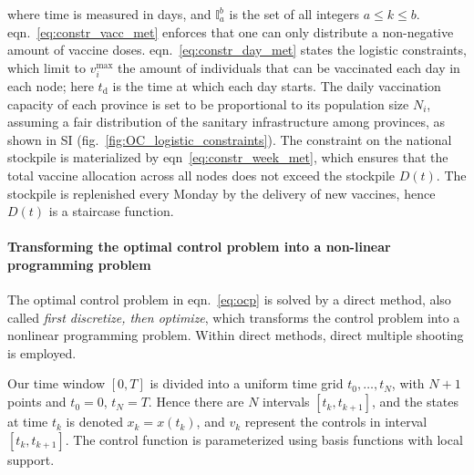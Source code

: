 where time is measured in days, and $\mathbb{I}_a^b$ is the set of all integers $a\leq k\leq b$. eqn.~\eqref{eq:constr_vacc_met} enforces that one can only distribute a non-negative amount of vaccine doses. eqn.~\eqref{eq:constr_day_met} states the logistic constraints, which limit to $v_i^\mathrm{max}$ the amount of individuals that can be vaccinated each day in each node; here $t_\mathrm{d}$ is the time at which each day starts. The daily vaccination capacity of each province is set to be proportional to its population size $N_i$, assuming a fair distribution of the sanitary infrastructure among provinces, as shown in SI (fig.~\ref{fig:OC_logistic_constraints}). The constraint on the national stockpile is materialized by eqn~\eqref{eq:constr_week_met}, which ensures that the total vaccine allocation across all nodes does not exceed the stockpile $D(t)$. The stockpile is replenished every Monday by the delivery of new vaccines, hence $D(t)$ is a staircase function.



\paragraph{Transforming the optimal control problem into a non-linear programming problem}


The optimal control problem in eqn.~\eqref{eq:ocp} is solved by a direct method, also called \emph{first discretize, then optimize}, which transforms the control problem into a nonlinear programming problem. Within direct methods, direct multiple shooting is employed. 


Our time window $[0,T]$ is divided into a uniform time grid $t_0,\ldots,t_N$, with $N+1$ points and $t_0=0$, $t_N=T$. Hence there are $N$ intervals $[t_k,t_{k+1}]$, and the states at time $t_k$ is denoted $x_k=x(t_k)$, and $v_k$  represent the controls in interval $[t_k,t_{k+1}]$. The control function is parameterized using basis functions with local support. 

